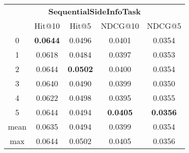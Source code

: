 \documentclass{article}
\begin{document}
 

\begin{tabular}{c|cccc}

\multicolumn{5}{c}{\textbf{SequentialSideInfoTask}} \\
\noalign{\smallskip}
\noalign{\smallskip}
\toprule
\multicolumn{1}{c}{Template ID} & \multicolumn{1}{|c}{Hit@10} & \multicolumn{1}{c}{Hit@5} & \multicolumn{1}{c}{NDCG@10} & \multicolumn{1}{c}{NDCG@5} \\
\midrule
0 & \textbf{0.0644} & 0.0496 & 0.0401 & 0.0354 \\
1 & 0.0618 & 0.0484 & 0.0397 & 0.0353 \\
2 & 0.0644 & \textbf{0.0502} & 0.0400 & 0.0354 \\
3 & 0.0640 & 0.0490 & 0.0399 & 0.0350 \\
4 & 0.0622 & 0.0498 & 0.0395 & 0.0355 \\
5 & 0.0644 & 0.0494 & \textbf{0.0405} & \textbf{0.0356} \\
\midrule
mean & 0.0635 & 0.0494 & 0.0399 & 0.0354 \\
max & 0.0644 & 0.0502 & 0.0405 & 0.0356 \\
\bottomrule

\end{tabular}
\end{document}

